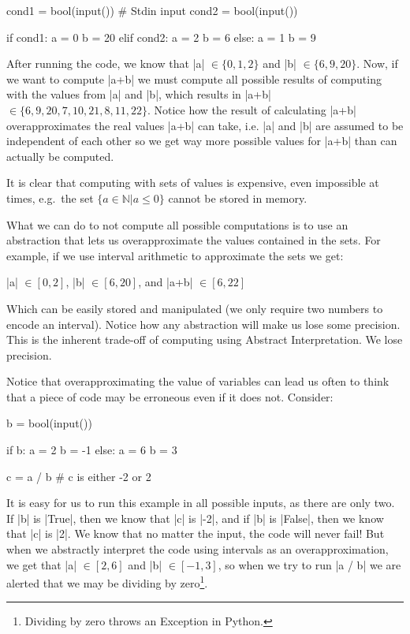 \begin{pythoncode}
cond1 = bool(input())  # Stdin input
cond2 = bool(input())

if cond1:
  a = 0
  b = 20
elif cond2:
  a = 2
  b = 6
else:
  a = 1
  b = 9
\end{pythoncode}

After running the code, we know that \pycode|a| \(\in \{0, 1, 2\}\) and \pycode|b| \(\in
  \{6, 9, 20\}\). Now, if we want to compute \pycode|a+b| we must compute all possible
results of computing with the values from \pycode|a| and \pycode|b|, which results in
\pycode|a+b| \(\in \{6, 9, 20, 7, 10, 21, 8, 11, 22\}\). Notice how the result of
calculating \pycode|a+b| overapproximates the real values \pycode|a+b| can take, i.e.
\pycode|a| and \pycode|b| are assumed to be independent of each other so we get way more
possible values for \pycode|a+b| than can actually be computed.

It is clear that computing with sets of values is expensive, even
impossible at times, e.g.~the set \(\{a \in \mathbb{N} | a \leq 0\}\)
cannot be stored in memory.

What we can do to not compute all possible computations is to use an
abstraction that lets us overapproximate the values contained in the
sets. For example, if we use interval arithmetic to approximate the sets
we get:

\pycode|a| \(\in \left[0, 2\right]\), \pycode|b|
\(\in \left[6, 20\right]\), and \pycode|a+b| \(\in \left[6, 22\right]\)

Which can be easily stored and manipulated (we only require two numbers to encode an
interval). Notice how any abstraction will make us lose some precision. This is the
inherent trade-off of computing using Abstract Interpretation. We lose precision.

Notice that overapproximating the value of variables can lead us often
to think that a piece of code may be erroneous even if it does not.
Consider:

\begin{pythoncode}
b = bool(input())

if b:
  a = 2
  b = -1
else:
  a = 6
  b = 3

c = a / b  # c is either -2 or 2
\end{pythoncode}

It is easy for us to run this example in all possible inputs, as there are only two. If
\pycode|b| is \pycode|True|, then we know that \pycode|c| is \pycode|-2|, and if
\pycode|b| is \pycode|False|, then we know that \pycode|c| is \pycode|2|. We know that no
matter the input, the code will never fail!  But when we abstractly interpret the code
using intervals as an overapproximation, we get that \pycode|a| \(\in [2,6]\) and
\pycode|b| \(\in [-1,3]\), so when we try to run \pycode|a / b| we are alerted that we may
be dividing by zero\footnote{Dividing by zero throws an Exception in Python.}.

